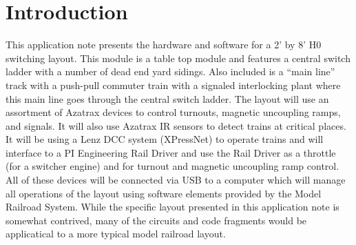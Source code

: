 
\chapter{Introduction}
\label{chapt:Introduction}

This application note presents the hardware and software for a 2' by 8'
H0 switching layout.  This module is a table top module and features a
central switch ladder with a number of dead end yard sidings.  Also
included is a ``main line'' track with a push-pull commuter train with
a signaled interlocking plant where this main line goes through the
central switch ladder.  The layout will use an assortment of Azatrax
devices to control turnouts, magnetic uncoupling ramps, and signals. It
will also use Azatrax IR sensors to detect trains at critical places.
It will be using a Lenz DCC system (XPressNet) to operate trains and
will interface to a PI Engineering Rail Driver and use the Rail Driver
as a throttle (for a switcher engine) and for turnout and magnetic
uncoupling ramp control. All of these devices will be connected via USB
to a computer which will manage all operations of the layout using
software elements provided by the Model Railroad System. While the
specific layout presented in this application note is somewhat
contrived, many of the circuits and code fragments would be
applicatical to a more typical model railroad layout.  

